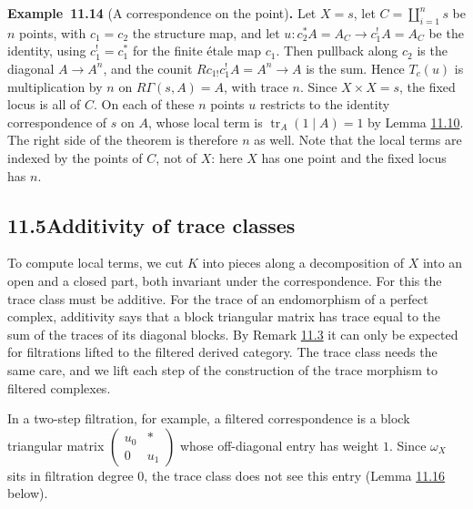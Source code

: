 \documentclass[11pt]{article}
\newenvironment{bpstatement}[2]{\par\addvspace{0.6\baselineskip}\noindent\textbf{#1}#2\textbf{.}\enspace\ignorespaces}
  {\par\addvspace{0.4\baselineskip}}
\begin{document}
\label{bp39}%
\begin{bpstatement}{Example~11.14}{ (A correspondence on the point)}
Let \(X=s\), let \(C=\coprod_{i=1}^ns\) be \(n\) points, with \(c_1=c_2\) the structure map, and let \(u:c_2^*A=A_C\to c_1^!A=A_C\) be the identity, using \(c_1^!=c_1^*\) for the finite étale map \(c_1\). Then pullback along \(c_2\) is the diagonal \(A\to A^n\), and the counit \(Rc_{1!}c_1^!A=A^n\to A\) is the sum. Hence \(T_c(u)\) is multiplication by \(n\) on \(R\Gamma(s,A)=A\), with trace \(n\). Since \(X\times X=s\), the fixed locus is all of \(C\). On each of these \(n\) points \(u\) restricts to the identity correspondence of \(s\) on \(A\), whose local term is \(\operatorname{tr}_A(1\mid A)=1\) by Lemma \hyperref[bp30]{11.10}. The right side of the theorem is therefore \(n\) as well. Note that the local terms are indexed by the points of \(C\), not of \(X\): here \(X\) has one point and the fixed locus has \(n\).
\end{bpstatement}


\subsection*{\texorpdfstring{11.5\quad Additivity of trace classes}{11.5 Additivity of trace classes}}
\label{bp40}%
\label{bp41}%
To compute local terms, we cut \(K\) into pieces along a decomposition of \(X\) into an open and a closed part, both invariant under the correspondence. For this the trace class must be additive. For the trace of an endomorphism of a perfect complex, additivity says that a block triangular matrix has trace equal to the sum of the traces of its diagonal blocks. By Remark \hyperref[bp10]{11.3} it can only be expected for filtrations lifted to the filtered derived category. The trace class needs the same care, and we lift each step of the construction of the trace morphism to filtered complexes.

In a two-step filtration, for example, a filtered correspondence is a block triangular matrix \(\left(\begin{smallmatrix}u_0&*\\0&u_1\end{smallmatrix}\right)\) whose off-diagonal entry has weight \(1\). Since \(\omega_X\) sits in filtration degree \(0\), the trace class does not see this entry (Lemma \hyperref[bp45]{11.16} below).
\end{document}
